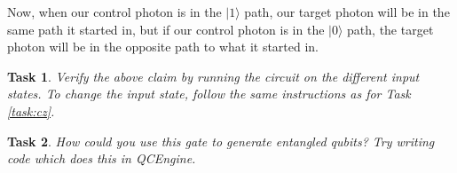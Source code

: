 \documentclass[twocolumn]{article}
\newtheorem{task}{Task}[section]
\begin{document}
Now, when our control photon is in the $|1\rangle$ path, our target photon will be in the same path it started in, but if our control photon is in the $|0\rangle$ path, the target photon will be in the opposite path to what it started in.

\begin{task}
Verify the above claim by running the circuit on the different input states. To change the input state, follow the same instructions as for Task \ref{task:cz}.
\end{task}

\begin{task}
How could you use this gate to generate entangled qubits? Try writing code which does this in QCEngine.
\end{task}
\end{document}
